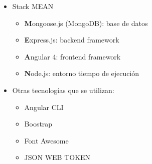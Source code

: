 \begin{itemize}
  \item Stack MEAN
  \begin{itemize}
    \item \textbf{M}ongoose.js (MongoDB):  base de datos
    \item \textbf{E}xpress.js: backend framework
    \item \textbf{A}ngular 4: frontend framework
    \item \textbf{N}ode.js: entorno tiempo de ejecución
  \end{itemize}
  \item Otras tecnologías que se utilizan:
  \begin{itemize}
    \item Angular CLI
    \item Boostrap
    \item Font Awesome
    \item JSON WEB TOKEN
  \end{itemize}
\end{itemize}




